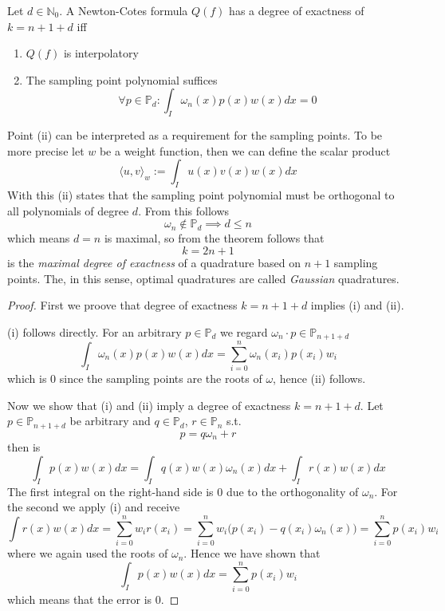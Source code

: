 \begin{theorem}\label{thm:max_deg_exact}
   Let \(d \in \mathbb{N}_0\).
   A Newton-Cotes formula \(Q(f)\) has a degree of exactness of \(k = n + 1 + d\) iff
   \begin{enumerate}[label=\roman*, align=Center]
      \item \(Q(f)\) is interpolatory
      \item The sampling point polynomial suffices
         \[\forall p \in \mathbb{P}_d: \int_I \omega_n(x) p(x) w(x) dx = 0\]
   \end{enumerate}
\end{theorem}
\begin{remark}
   Point (ii) can be interpreted as a requirement for the sampling points.
   To be more precise let \(w\) be a weight function, then we can define the scalar product
   \[\langle u, v \rangle_w := \int_I u(x) v(x) w(x) dx\]
   With this (ii) states that the sampling point polynomial must be orthogonal to all polynomials of degree \(d\).
   From this follows
   \[\omega_n \not\in \mathbb{P}_d \implies d \leq n\]
   which means \(d = n\) is maximal, so from the theorem follows that
   \[k = 2n + 1\]
   is the \emph{maximal degree of exactness} of a quadrature based on \(n+1\) sampling points.
   The, in this sense, optimal quadratures are called \emph{Gaussian} quadratures.
\end{remark}
\begin{proof}
   First we proove that degree of exactness \(k = n + 1 + d\) implies (i) and (ii).

   (i) follows directly.
   For an arbitrary \(p \in \mathbb{P}_d\) we regard \(\omega_n \cdot p \in \mathbb{P}_{n + 1 + d}\)
   \[\int_I \omega_n(x) p(x) w(x) dx = \sum_{i=0}^n \omega_n(x_i) p(x_i) w_i\]
   which is 0 since the sampling points are the roots of \(\omega\), hence (ii) follows.

   Now we show that (i) and (ii) imply a degree of exactness \(k = n + 1 + d\).
   Let \(p \in \mathbb{P}_{n+1+d}\) be arbitrary and \(q \in \mathbb{P}_d\), \(r \in \mathbb{P}_n\) s.t.
   \[p = q \omega_n + r\]
   then is
   \[\int_I p(x) w(x) dx = \int_I q(x) w(x) \omega_n(x) dx + \int_I r(x) w(x)dx\]
   The first integral on the right-hand side is 0 due to the orthogonality of \(\omega_n\).
   For the second we apply (i) and receive
   \[\int r(x) w(x) dx = \sum_{i=0}^n w_i r(x_i) = \sum_{i=0}^n w_i \big(p(x_i) - q(x_i) \omega_n(x)\big) = \sum_{i=0}^n p(x_i) w_i\]
   where we again used the roots of \(\omega_n\).
   Hence we have shown that
   \[\int_I p(x) w(x) dx = \sum_{i=0}^n p(x_i) w_i\]
   which means that the error is 0.
\end{proof}


